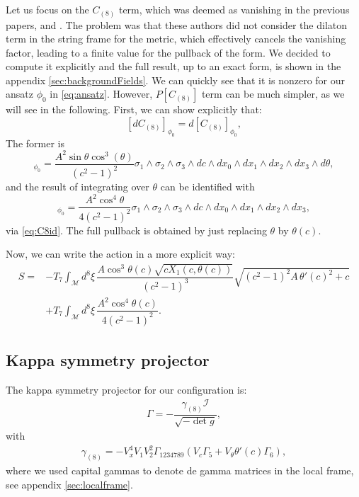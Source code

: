 Let us focus on the $C_{(8)}$ term, which was deemed as vanishing in the previous papers, \cite{Albash:2011nw} and \cite{Evans:2005ti}. The problem was that these authors did not consider the dilaton term in the string frame for the metric, which effectively cancels the vanishing factor, leading to a finite value for the pullback of the form. We decided to compute it explicitly and the full result, up to an exact form, is shown in the appendix \ref{sec:backgroundFields}. We can quickly see that it is nonzero for our ansatz $\phi_0$ in \eqref{eq:ansatz}. However, $P[C_{(8)}]$ term can be much simpler, as we will see in the following. First, we can show explicitly that:
\begin{equation}\label{eq:C8id}
 [d C_{(8)}]_{\phi_0} = d [C_{(8)}]_{\phi_0},
\end{equation}
The former is
\begin{equation}
 [d C_{(8)}]_{\phi_0}  = \dfrac{A^2 \sin\theta \cos^3(\theta)}{\left(c^2-1\right)^2} 
\sigma_1 \wedge \sigma_2 \wedge \sigma_3 \wedge dc  \wedge dx_0 \wedge dx_1 \wedge dx_2 \wedge dx_3 \wedge d\theta,
\end{equation}
and the result of integrating over $\theta$ can be identified with
\begin{equation}
[C_{(8)}]_{\phi_0} = \dfrac{A^2 \cos^4\theta}{4 \left(c^2-1\right)^2} \sigma_1 \wedge \sigma_2 \wedge \sigma_3 \wedge dc \wedge dx_0 \wedge dx_1 \wedge dx_2 \wedge dx_3,
\end{equation}
via \eqref{eq:C8id}. The full pullback is obtained by just replacing $\theta$ by $\theta(c)$.


Now, we can write the action in a more explicit way:
\begin{align}\label{eq:ActionWithTheta'}
 S = & -T_7 \int_\mathcal{M} d^8\xi \, \dfrac{A \cos^3\theta (c) \sqrt{c X_1(c, \theta(c))}}{\left(c^2-1\right)^3} \sqrt{\left(c^2-1\right)^2 A \, \theta '(c)^2+c} \nonumber \\
     & +T_7\int _\mathcal{M} d^8\xi \, \dfrac{A^2 \cos^4\theta(c)}{4 \left(c^2-1\right)^2}.
\end{align}



\subsection{Kappa symmetry projector}

The kappa symmetry projector for our configuration is:
\begin{align}
\Gamma = - \dfrac{ \gamma_{(8)} \mathcal{I} }{\sqrt{-\det g}},
\end{align}
with
\begin{align}
 \gamma_{(8)} = - V_x^4 V_1 V_2^2 \Gamma_{1 2 3 4 7 8 9}( V_c \Gamma_5 +  V_{\theta} \theta'(c) \Gamma_6), 
\end{align}
where we used capital gammas to denote de gamma matrices in the local frame, see appendix \ref{sec:localframe}.

